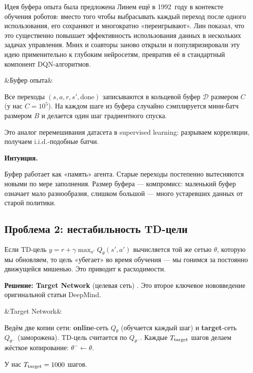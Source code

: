 \documentclass[a4paper, 11pt]{article}
\newenvironment{defbox}[1][]{%
  \begin{mdframed}[style=defstyle]
  \ifx&#1&\else{\bfseries\color{defblue}#1.}\quad\fi\ignorespaces
}{%
  \end{mdframed}
}
\newenvironment{notebox}{%
  \begin{mdframed}[style=notestyle]
  {\bfseries\color{noteborder}Интуиция.}\quad\ignorespaces
}{%
  \end{mdframed}
}
\begin{document}
Идея буфера опыта была предложена Линем ещё в 1992~году в контексте
обучения роботов: вместо того чтобы выбрасывать каждый переход после
одного использования, его сохраняют и многократно «переигрывают».
Лин показал, что это существенно повышает эффективность использования
данных в нескольких задачах управления. Мних и соавторы \cite{Mnih15}
заново открыли и популяризировали эту идею применительно к глубоким
нейросетям, превратив её в стандартный компонент DQN-алгоритмов.

\begin{defbox}[Буфер опыта]
Все переходы $(s, a, r, s', \text{done})$ записываются в кольцевой буфер
$\mathcal{D}$ размером $C$ (у нас $C = 10^5$). На каждом шаге из буфера
случайно сэмплируется мини-батч размером $B$ и делается один шаг
градиентного спуска.
\end{defbox}

Это аналог перемешивания датасета в supervised learning: разрываем
корреляции, получаем i.i.d.-подобные батчи.

\begin{notebox}
Буфер работает как «память» агента. Старые переходы постепенно
вытесняются новыми по мере заполнения. Размер буфера — компромисс:
маленький буфер означает мало разнообразия, слишком большой — много
устаревших данных от старой политики.
\end{notebox}

\subsection{Проблема 2: нестабильность TD-цели}

Если TD-цель $y = r + \gamma \max_{a'} Q_\theta(s', a')$ вычисляется той
же сетью $\theta$, которую мы обновляем, то цель «убегает» во время
обучения — мы гонимся за постоянно движущейся мишенью. Это приводит к
расходимости.

\textbf{Решение: Target Network} (целевая сеть) \cite{Mnih15}. Это второе
ключевое нововведение оригинальной статьи DeepMind.

\begin{defbox}[Target Network]
Ведём две копии сети: \textbf{online}-сеть $Q_\theta$ (обучается каждый шаг)
и \textbf{target}-сеть $Q_{\theta^-}$ (заморожена). TD-цель считается по
$Q_{\theta^-}$. Каждые $T_{\rm target}$ шагов делаем жёсткое копирование:
$\theta^- \leftarrow \theta$.

У нас $T_{\rm target} = 1000$ шагов.
\end{defbox}
\end{document}
